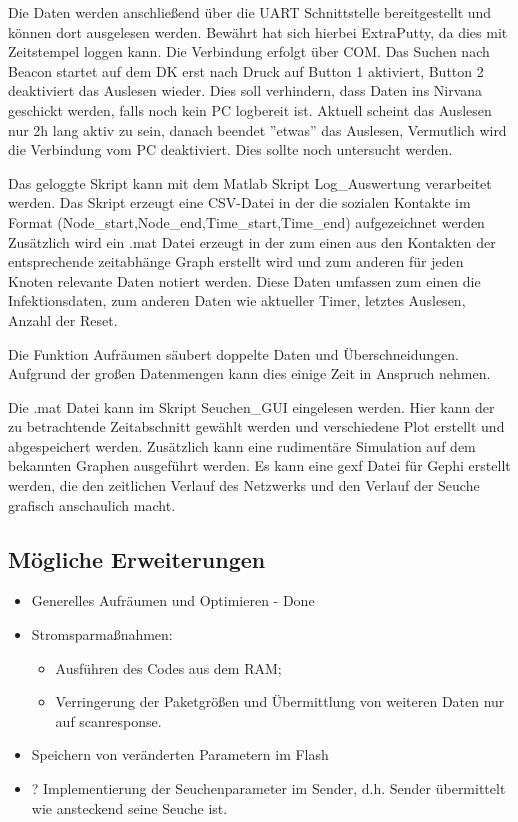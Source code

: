 \documentclass[11pt,ngerman]{scrartcl} %
\begin{document}
Die Daten werden anschließend über die UART Schnittstelle bereitgestellt und können dort ausgelesen werden. Bewährt hat sich hierbei ExtraPutty, da dies mit Zeitstempel loggen kann. Die Verbindung erfolgt über COM.
Das Suchen nach Beacon startet auf dem DK erst nach Druck auf Button 1 aktiviert, Button 2 deaktiviert das Auslesen wieder. Dies soll verhindern, dass Daten ins Nirvana geschickt werden, falls noch kein PC logbereit ist.
Aktuell scheint das Auslesen nur 2h lang aktiv zu sein, danach beendet ''etwas'' das Auslesen, Vermutlich wird die Verbindung vom PC deaktiviert. Dies sollte noch untersucht werden.

Das geloggte Skript kann mit dem Matlab Skript Log\_Auswertung verarbeitet werden. Das Skript erzeugt eine CSV-Datei in der die sozialen Kontakte im Format (Node\_start,Node\_end,Time\_start,Time\_end)  aufgezeichnet werden
Zusätzlich wird ein .mat Datei erzeugt in der zum einen aus den Kontakten der entsprechende zeitabhänge Graph erstellt wird und zum anderen für jeden Knoten relevante Daten notiert werden. Diese Daten umfassen zum einen die Infektionsdaten, zum anderen Daten wie aktueller Timer, letztes Auslesen, Anzahl der Reset. 

Die Funktion Aufräumen säubert doppelte Daten und Überschneidungen. Aufgrund der großen Datenmengen kann dies einige Zeit in Anspruch nehmen.

Die .mat Datei kann im Skript Seuchen\_GUI eingelesen werden. Hier kann der zu betrachtende Zeitabschnitt gewählt werden und verschiedene Plot erstellt und abgespeichert werden. Zusätzlich kann eine rudimentäre Simulation auf dem bekannten Graphen ausgeführt werden.
Es kann eine gexf Datei für Gephi erstellt werden, die den zeitlichen Verlauf des Netzwerks und den Verlauf der Seuche grafisch anschaulich macht.


\subsection{Mögliche Erweiterungen}
\begin{itemize}
\item  Generelles Aufräumen und Optimieren - Done
\item  Stromsparmaßnahmen: 
\begin{itemize}
\item 	Ausführen des Codes aus dem RAM; 
\item Verringerung der Paketgrößen und Übermittlung von weiteren Daten nur auf scanresponse. 
\end{itemize} 
\item  Speichern von veränderten Parametern im Flash
\item  ? Implementierung der Seuchenparameter im Sender, d.h. Sender übermittelt wie ansteckend seine Seuche ist.
\end{itemize}
\end{document}
